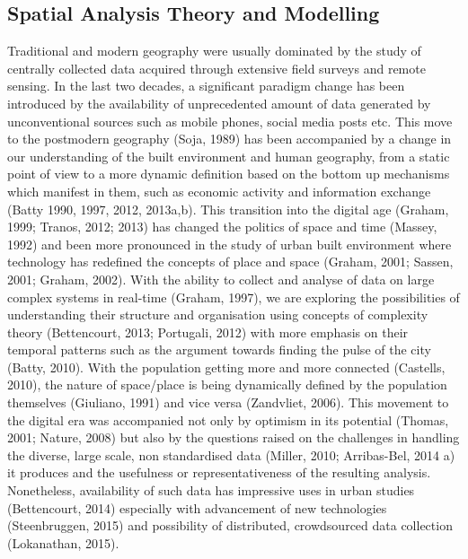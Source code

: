 \subsection{Spatial Analysis Theory and Modelling}
Traditional and modern geography were usually dominated by the study of centrally collected data acquired through extensive field surveys and remote sensing.
In the last two decades, a significant paradigm change has been introduced by the availability of unprecedented amount of data generated by unconventional sources such as mobile phones, social media posts etc.
This move to the postmodern geography (Soja, 1989) has been accompanied by a change in our understanding of the built environment and human geography, from a static point of view to a more dynamic definition based on the bottom up mechanisms which manifest in them, such as economic activity and information exchange (Batty 1990, 1997, 2012, 2013a,b).
This transition into the digital age (Graham, 1999; Tranos, 2012; 2013) has changed the politics of space and time (Massey, 1992) and been more pronounced in the study of urban built environment where technology has redefined the concepts of place and space (Graham, 2001; Sassen, 2001; Graham, 2002).
With the ability to collect and analyse of data on large complex systems in real-time (Graham, 1997), we are exploring the possibilities of understanding their structure and organisation using concepts of complexity theory (Bettencourt, 2013; Portugali, 2012) with more emphasis on their temporal patterns such as the argument towards finding the pulse of the city (Batty, 2010).
With the population getting more and more connected (Castells, 2010), the nature of space/place is being dynamically defined by the population themselves (Giuliano, 1991) and vice versa (Zandvliet, 2006).
This movement to the digital era was accompanied not only by optimism in its potential (Thomas, 2001; Nature, 2008) but also by the questions raised on the challenges in handling the diverse, large scale, non standardised data (Miller, 2010; Arribas-Bel, 2014 a) it produces and the usefulness or representativeness of the resulting analysis.
Nonetheless, availability of such data has impressive uses in urban studies (Bettencourt, 2014) especially with advancement of new technologies (Steenbruggen, 2015) and possibility of distributed, crowdsourced data collection (Lokanathan, 2015).

